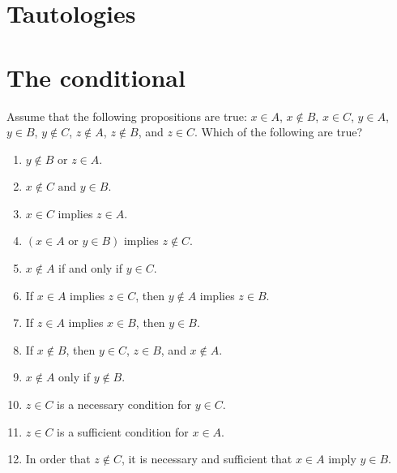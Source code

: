 \documentclass{report}
\renewcommand*{\land}{\text{ and }}
\renewcommand*{\lor}{\text{ or }}
\begin{document}
\section{Tautologies}
\section{The conditional}
\begin{exercise}
Assume that the following propositions are true: $x\in A$, $x\nin B$, $x\in C$, $y\in A$,
$y\in B$, $y\nin C$, $z\nin A$, $z\nin B$, and $z\in C$. Which of the following are true?
\begin{enumerate}[label=(\alph*)]
    \item $y\nin B\lor z\in A$.
    \item $x\nin C\land y\in B$.
    \item $x\in C$ implies $z\in A$.
    \item $(x\in A\lor y\in B)$ implies $z\nin C$.
    \item $x\nin A$ if and only if $y\in C$.
    \item If $x\in A$ implies $z\in C$, then $y\nin A$ implies $z\in B$.
    \item If $z\in A$ implies $x\in B$, then $y\in B$.
    \item If $x\nin B$, then $y\in C$, $z\in B$, and $x\nin A$.
    \item $x\nin A$ only if $y\nin B$.
    \item $z\in C$ is a necessary condition for $y\in C$.
    \item $z\in C$ is a sufficient condition for $x\in A$.
    \item In order that $z\nin C$, it is necessary and sufficient that $x\in A$ imply $y\in B$.
\end{enumerate}
\end{exercise}
\end{document}
